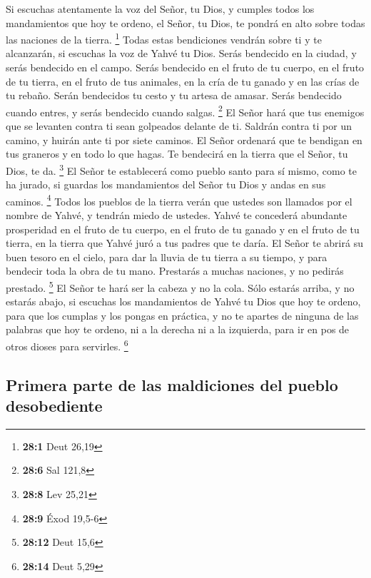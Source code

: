 \begin{paracol}{2}
 Si escuchas atentamente la voz del Señor, tu Dios, y
cumples todos los mandamientos que hoy te ordeno, el Señor, tu Dios, te
pondrá en alto sobre todas las naciones de la tierra. \footnote{\textbf{28:1}
  Deut 26,19}  Todas estas bendiciones vendrán sobre ti y
te alcanzarán, si escuchas la voz de Yahvé tu Dios.  Serás
bendecido en la ciudad, y serás bendecido en el campo. 
Serás bendecido en el fruto de tu cuerpo, en el fruto de tu tierra, en
el fruto de tus animales, en la cría de tu ganado y en las crías de tu
rebaño.  Serán bendecidos tu cesto y tu artesa de amasar.
 Serás bendecido cuando entres, y serás bendecido cuando
salgas. \footnote{\textbf{28:6} Sal 121,8}  El Señor hará
que tus enemigos que se levanten contra ti sean golpeados delante de ti.
Saldrán contra ti por un camino, y huirán ante ti por siete caminos.
 El Señor ordenará que te bendigan en tus graneros y en
todo lo que hagas. Te bendecirá en la tierra que el Señor, tu Dios, te
da. \footnote{\textbf{28:8} Lev 25,21}  El Señor te
establecerá como pueblo santo para sí mismo, como te ha jurado, si
guardas los mandamientos del Señor tu Dios y andas en sus caminos.
\footnote{\textbf{28:9} Éxod 19,5-6}  Todos los pueblos
de la tierra verán que ustedes son llamados por el nombre de Yahvé, y
tendrán miedo de ustedes.  Yahvé te concederá abundante
prosperidad en el fruto de tu cuerpo, en el fruto de tu ganado y en el
fruto de tu tierra, en la tierra que Yahvé juró a tus padres que te
daría.  El Señor te abrirá su buen tesoro en el cielo,
para dar la lluvia de tu tierra a su tiempo, y para bendecir toda la
obra de tu mano. Prestarás a muchas naciones, y no pedirás prestado.
\footnote{\textbf{28:12} Deut 15,6}  El Señor te hará ser
la cabeza y no la cola. Sólo estarás arriba, y no estarás abajo, si
escuchas los mandamientos de Yahvé tu Dios que hoy te ordeno, para que
los cumplas y los pongas en práctica,  y no te apartes de
ninguna de las palabras que hoy te ordeno, ni a la derecha ni a la
izquierda, para ir en pos de otros dioses para servirles. \footnote{\textbf{28:14}
  Deut 5,29}

\hypertarget{primera-parte-de-las-maldiciones-del-pueblo-desobediente}{%
\subsection{Primera parte de las maldiciones del pueblo
desobediente}\label{primera-parte-de-las-maldiciones-del-pueblo-desobediente}}


\end{paracol}
